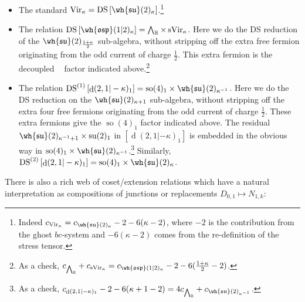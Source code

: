 \documentclass[11pt,reqno]{amsart}
\theoremstyle{plain}
\numberwithin{equation}{section}
\newcommand{\R}{\mathbb{R}}
\DeclareMathOperator{\Vir}{Vir}
\DeclareMathOperator{\sVir}{sVir}
\DeclareMathOperator{\td}{d}
\DeclareMathOperator{\tsu}{su}
\DeclareMathOperator{\tso}{so}
\DeclareMathOperator{\DS}{DS}
\DeclareMathOperator{\Ff}{\bigwedge_{\R}}
\theoremstyle{definition}
\begin{document}
\begin{itemize}
\item The standard $\Vir_\kappa = \DS
  \left[\wh{\mathfrak{su}}(2)_{\kappa}\right]$.\footnote{Indeed
$c_{\Vir_\kappa} = c_{\wh{\mathfrak{su}}(2)_\kappa}-2-6(\kappa-2)$, where
$-2$ is the contribution from the ghost $bc$-system and
$-6(\kappa-2)$ comes from the re-definition of the stress tensor.}

\medskip

\item The relation $\DS \left[\wh{\mathfrak{osp}}(1|2)_{\kappa}\right]=\Ff
  \times \sVir_\kappa$. Here we do the
DS reduction of the $\wh{\mathfrak{su}}(2)_{\frac{1+\kappa}{2}}$
sub-algebra, without stripping off
the extra free fermion originating from the odd current of charge
$\frac12$. This extra fermion is the
decoupled $\Ff$ factor indicated above.\footnote{As a check, $c_{\Ff} +
c_{\sVir_\kappa} =
c_{\wh{\mathfrak{osp}}(1|2)_\kappa}-2-6(\frac{1+\kappa}{2}-2)$.}

\medskip

\item The relation $\DS^{(1)}
  \left[\td(2,1|-\kappa)_1\right]=\tso(4)_1 \times
  \wh{\mathfrak{su}}(2)_{\kappa^{-1}}$. Here we do the DS reduction on the
  $\wh{\mathfrak{su}}(2)_{\kappa+1}$ sub-algebra, without stripping off
the extra four free fermions originating from the odd current of
charge $\frac12$. These extra fermions give the
$\tso(4)_1$ factor indicated above. The residual
$\wh{\mathfrak{su}}(2)_{\kappa^{-1}+1} \times \tsu(2)_1$ in
$\left[\td(2,1|-\kappa)_1\right]$
is embedded in the obvious way in $\tso(4)_1
\times \wh{\mathfrak{su}}(2)_{\kappa^{-1}}$.\footnote{As a check,
  $c_{\td(2,1|-\kappa)_1}-2-6(\kappa+1-2) = 4 c_{\Ff} +
c_{\wh{\mathfrak{su}}(2)_{\kappa^{-1}}}$.} Similarly, $\DS^{(2)}
\left[\td(2,1|-\kappa)_1\right]=\tso(4)_1 \times
\wh{\mathfrak{su}}(2)_{\kappa}$.
\end{itemize}


\medskip

There is also a rich web of coset/extension relations which have a
natural interpretation as compositions of junctions or replacements
$D_{0,1} \mapsto N_{1,k}$:

\medskip
\end{document}
